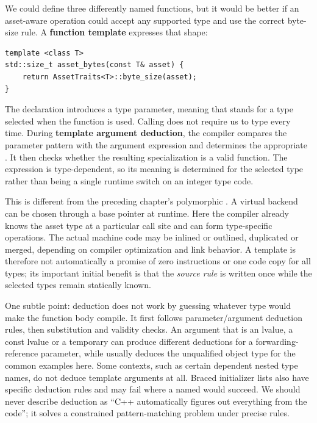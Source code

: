We could define three differently named functions, but it would be better if an asset-aware operation could accept any supported type and use the correct byte-size rule. A \textbf{function template} expresses that shape:

\begin{verbatim}
template <class T>
std::size_t asset_bytes(const T& asset) {
    return AssetTraits<T>::byte_size(asset);
}
\end{verbatim}

The  declaration introduces a type parameter, meaning that  stands for a type selected when the function is used. Calling  does not require us to type  every time. During \textbf{template argument deduction}, the compiler compares the parameter pattern  with the argument expression and determines the appropriate . It then checks whether the resulting specialization is a valid function. The expression  is type-dependent, so its meaning is determined for the selected type rather than being a single runtime switch on an integer type code.

This is different from the preceding chapter's polymorphic . A virtual backend can be chosen through a base pointer at runtime. Here the compiler already knows the asset type at a particular call site and can form type-specific operations. The actual machine code may be inlined or outlined, duplicated or merged, depending on compiler optimization and link behavior. A template is therefore not automatically a promise of zero instructions or one code copy for all types; its important initial benefit is that the \emph{source rule} is written once while the selected types remain statically known.

One subtle point: deduction does not work by guessing whatever type would make the function body compile. It first follows parameter/argument deduction rules, then substitution and validity checks. An argument that is an lvalue, a const lvalue or a temporary can produce different deductions for a forwarding-reference parameter, while  usually deduces the unqualified object type for the common examples here. Some contexts, such as certain dependent nested type names, do not deduce template arguments at all. Braced initializer lists also have specific deduction rules and may fail where a named  would succeed. We should never describe deduction as ``C++ automatically figures out everything from the code''; it solves a constrained pattern-matching problem under precise rules.

